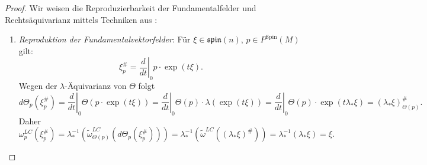 \documentclass[10pt, letterpaper]{article}
\newcommand{\Spin}{\mathrm{Spin}}
\begin{document}
\begin{proof}
Wir weisen die Reproduzierbarkeit der Fundamentalfelder und Rechtsäquivarianz mittels Techniken aus \parencite[]{Kraus2025}:
  \begin{enumerate}
    \item \emph{Reproduktion der Fundamentalvektorfelder}: Für $\xi \in \mathfrak{spin}(n)$, $p\in P^\Spin(M)$ gilt:
    $$
    \xi_p^{\#}=\left.\frac{d}{d t}\right|_0 p \cdot \exp (t \xi) .
    $$
    Wegen der $\lambda$-Äquivarianz von $\Theta$ folgt
    $$
    d \Theta_p\left(\xi_p^{\#}\right)=\left.\frac{d}{d t}\right|_0 \Theta(p \cdot \exp (t \xi))=\left.\frac{d}{d t}\right|_0 \Theta(p) \cdot \lambda(\exp (t \xi))=\left.\frac{d}{d t}\right|_0 \Theta(p) \cdot \exp (t \lambda_* \xi)=\left(\lambda_* \xi\right)_{\Theta(p)}^{\#} .
    $$
    Daher
    $$
    \omega_p^{L C}\left(\xi_p^{\#}\right)=\lambda_*^{-1}\left(\widetilde{\omega}_{\Theta(p)}^{L C}\left(d \Theta_p\left(\xi_p^{\#}\right)\right)\right)=\lambda_*^{-1}\left(\widetilde{\omega}^{L C}\left(\left(\lambda_* \xi\right)^{\#}\right)\right)=\lambda_*^{-1}\left(\lambda_* \xi\right)=\xi .
    $$


\end{enumerate}
\end{proof}
\end{document}
